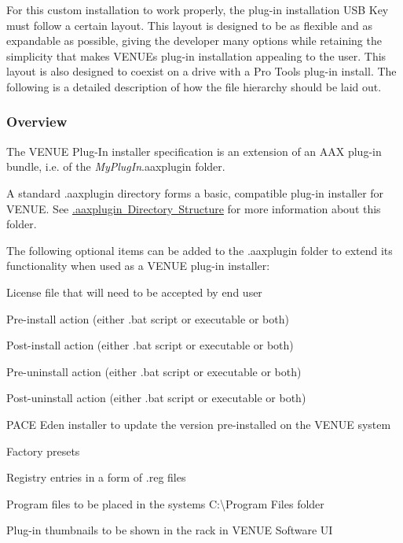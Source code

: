  For this custom installation to work properly, the plug-\/in installation U\+SB Key must follow a certain layout. This layout is designed to be as flexible and as expandable as possible, giving the developer many options while retaining the simplicity that makes V\+E\+N\+UE\textquotesingle{}s plug-\/in installation appealing to the user. This layout is also designed to coexist on a drive with a Pro Tools plug-\/in install. The following is a detailed description of how the file hierarchy should be laid out.

\hypertarget{a00849_subsection__aax_venue_guide__installer__overview}{}\subsubsection{Overview}\label{a00849_subsection__aax_venue_guide__installer__overview}
 The V\+E\+N\+UE Plug-\/\+In installer specification is an extension of an A\+AX plug-\/in bundle, i.\+e. of the {\itshape My\+Plug\+In}.aaxplugin folder.

 A standard .aaxplugin directory forms a basic, compatible plug-\/in installer for V\+E\+N\+UE. See \mbox{\hyperlink{a00801_commoninterface_formatspecification__aaxplugin_directory_structure}{.aaxplugin Directory Structure}} for more information about this folder.

 The following optional items can be added to the .aaxplugin folder to extend its functionality when used as a V\+E\+N\+UE plug-\/in installer\+: 
\begin{DoxyItemize}
\item License file that will need to be accepted by end user 
\item Pre-\/install action (either .bat script or executable or both) 
\item Post-\/install action (either .bat script or executable or both) 
\item Pre-\/uninstall action (either .bat script or executable or both) 
\item Post-\/uninstall action (either .bat script or executable or both) 
\item P\+A\+CE Eden installer to update the version pre-\/installed on the V\+E\+N\+UE system 
\item Factory presets 
\item Registry entries in a form of .reg files 
\item Program files to be placed in the system\textquotesingle{}s C\+:\textbackslash{}Program Files folder 
\item Plug-\/in thumbnails to be shown in the rack in V\+E\+N\+UE Software UI 
\end{DoxyItemize}

